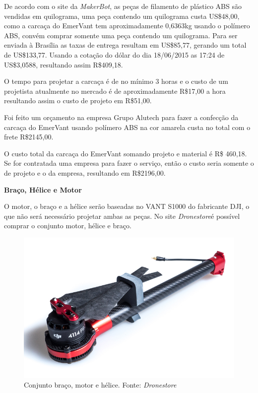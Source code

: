 De acordo com o site da \textit{MakerBot}\footnotemark, as peças de filamento de plástico ABS são vendidas em quilograma, uma peça contendo um quilograma custa US\$48,00, como a carcaça do EmerVant tem aproximadamente 0,6363kg usando o polímero ABS, convém comprar somente uma  peça contendo um quilograma. Para ser enviada à Brasília as taxas de entrega resultam em US\$85,77, gerando um total de US\$133,77. Usando a cotação do dólar do dia 18/06/2015 as 17:24 de US\$3,0588, resultando assim R\$409,18.

O tempo para projetar a carcaça é de no mínimo 3 horas e o custo de um projetista atualmente no mercado é de aproximadamente R\$17,00 a hora resultando assim o custo de projeto em R\$51,00.

Foi feito um orçamento na empresa Grupo Alutech para fazer a confecção da carcaça do EmerVant usando polímero ABS na cor amarela custa no total com o frete R\$2145,00.

O custo total da carcaça do EmerVant somando projeto e material é R\$ 460,18. Se for contratada uma empresa para fazer o serviço, então o custo seria somente o de projeto e o da empresa, resultando em R\$2196,00.


\indent \textbf{Braço, Hélice e Motor}

O motor, o braço e a hélice serão baseadas no VANT S1000 do fabricante DJI, o que
não será necessário projetar ambas as peças. No site \textit{Dronestore}\footnotemark é possível comprar o
conjunto motor, hélice e braço.


\begin{figure}[H]
    \centering
      \includegraphics[keepaspectratio=true,scale=0.4]{figuras/braco_helice.jpg}
    \caption{Conjunto braço, motor e hélice. Fonte: \textit{Dronestore}}
    \label{fig:braco_helice}
\end{figure}

